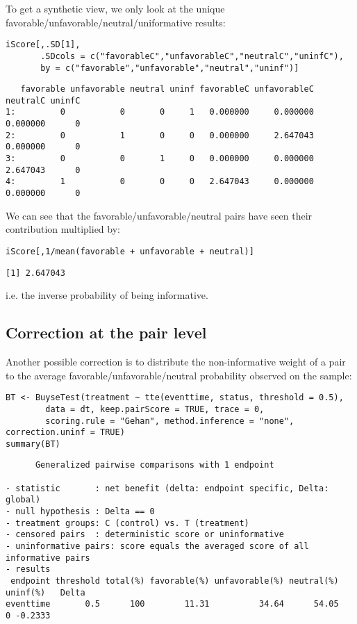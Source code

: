 \documentclass[12pt]{article}
\begin{document}
To get a synthetic view, we only look at the unique
favorable/unfavorable/neutral/uniformative results:
\lstset{language=r,label= ,caption= ,captionpos=b,numbers=none}
\begin{lstlisting}
iScore[,.SD[1], 
       .SDcols = c("favorableC","unfavorableC","neutralC","uninfC"),
       by = c("favorable","unfavorable","neutral","uninf")]
\end{lstlisting}

\begin{verbatim}
   favorable unfavorable neutral uninf favorableC unfavorableC neutralC uninfC
1:         0           0       0     1   0.000000     0.000000 0.000000      0
2:         0           1       0     0   0.000000     2.647043 0.000000      0
3:         0           0       1     0   0.000000     0.000000 2.647043      0
4:         1           0       0     0   2.647043     0.000000 0.000000      0
\end{verbatim}

We can see that the favorable/unfavorable/neutral pairs have seen
their contribution multiplied by:
\lstset{language=r,label= ,caption= ,captionpos=b,numbers=none}
\begin{lstlisting}
iScore[,1/mean(favorable + unfavorable + neutral)]
\end{lstlisting}

\begin{verbatim}
[1] 2.647043
\end{verbatim}

i.e. the inverse probability of being informative. 

\subsection{Correction at the pair level}
\label{sec:org23c302a}

Another possible correction is to distribute the non-informative
weight of a pair to the average favorable/unfavorable/neutral
probability observed on the sample:
\lstset{language=r,label= ,caption= ,captionpos=b,numbers=none}
\begin{lstlisting}
BT <- BuyseTest(treatment ~ tte(eventtime, status, threshold = 0.5),
		data = dt, keep.pairScore = TRUE, trace = 0,
		scoring.rule = "Gehan", method.inference = "none", correction.uninf = TRUE)
summary(BT)
\end{lstlisting}

\begin{verbatim}
      Generalized pairwise comparisons with 1 endpoint

- statistic       : net benefit (delta: endpoint specific, Delta: global) 
- null hypothesis : Delta == 0 
- treatment groups: C (control) vs. T (treatment) 
- censored pairs  : deterministic score or uninformative
- uninformative pairs: score equals the averaged score of all informative pairs
- results
 endpoint threshold total(%) favorable(%) unfavorable(%) neutral(%) uninf(%)   Delta
eventtime       0.5      100        11.31          34.64      54.05        0 -0.2333
\end{verbatim}
\end{document}
